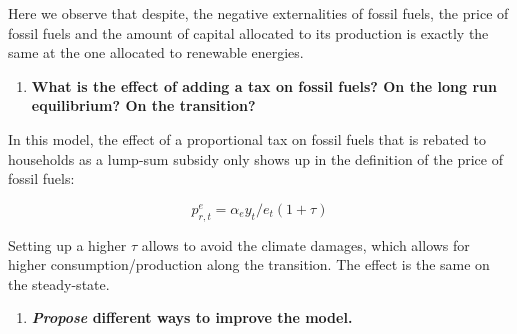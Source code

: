 \documentclass[
  letterpaper,
  DIV=11,
  numbers=noendperiod]{scrartcl}
\providecommand{\tightlist}{%
  \setlength{\itemsep}{0pt}\setlength{\parskip}{0pt}}\usepackage{longtable,booktabs,array}
\begin{document}
Here we observe that despite, the negative externalities of fossil
fuels, the price of fossil fuels and the amount of capital allocated to
its production is exactly the same at the one allocated to renewable
energies.

\begin{enumerate}
\def\labelenumi{\arabic{enumi}.}
\setcounter{enumi}{13}
\tightlist
\item
  \textbf{What is the effect of adding a tax on fossil fuels? On the
  long run equilibrium? On the transition?}
\end{enumerate}

In this model, the effect of a proportional tax on fossil fuels that is
rebated to households as a lump-sum subsidy only shows up in the
definition of the price of fossil fuels:

\[p^e_{r,t} = \alpha_e y_t / e_t (1+\tau)\]

Setting up a higher \(\tau\) allows to avoid the climate damages, which
allows for higher consumption/production along the transition. The
effect is the same on the steady-state.

\begin{enumerate}
\def\labelenumi{\arabic{enumi}.}
\setcounter{enumi}{14}
\tightlist
\item
  \textbf{\emph{Propose} different ways to improve the model.}
\end{enumerate}
\end{document}
